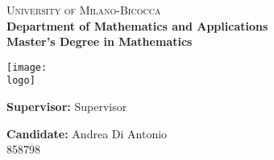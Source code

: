 \begin{titlepage}
    \thispagestyle{fancy}
    \fancyhf{}
	\fancyhead[C]{}
	\fancyfoot[C]{\large{\bf \documentdate}}

    \centering
    
    \begin{minipage}[t]{1\textwidth}
        \centering
        \huge{\textsc{University of Milano-Bicocca}} \\
        \large{\textbf{Department of Mathematics and Applications}} \\
        \large{\textbf{Master's Degree in Mathematics}} \\
    \end{minipage}
    
    \vspace{10mm}
        
    \centering
    \begin{minipage}[t]{1\textwidth}
    \centering
    \texttt{[image: \\logo]}
    \end{minipage}
    
    \vspace{10mm}
    
    \begin{center}
        \huge{\textbf{\documenttitle}}
    \end{center}
    
    \vspace{10mm}

    \begin{flushleft}
        \noindent \large{\textbf{Supervisor:} Supervisor}
    \end{flushleft}
    
    \vspace{10mm}

    \begin{flushright}
        \large{ \textbf{Candidate:} Andrea Di Antonio \\ 858798} %
    \end{flushright}
\end{titlepage}